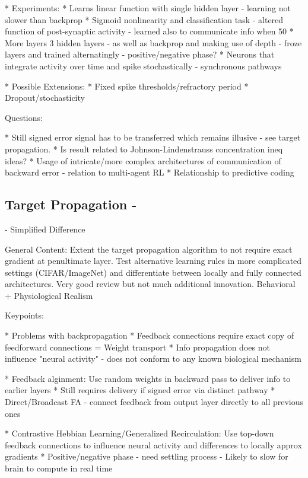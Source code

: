 \documentclass[colorinlistoftodos]{article}
\theoremstyle{definition}
\begin{document}
* Experiments:
    * Learns linear function with single hidden layer - learning not slower than backprop
    * Sigmoid nonlinearity and classification task - altered function of post-synaptic activity - learned also to communicate info when 50%
    * More layers 3 hidden layers - as well as backprop and making use of depth - froze layers and trained alternatingly - positive/negative phase?
    * Neurons that integrate activity over time and spike stochastically - synchronous pathways

* Possible Extensions:
    * Fixed spike thresholds/refractory period
    * Dropout/stochasticity

Questions:

* Still signed error signal has to be transferred which remains illusive - see target propagation.
* Is result related to Johnson-Lindenstrauss concentration ineq ideas?
* Usage of intricate/more complex architectures of communication of backward error - relation to multi-agent RL
* Relationship to predictive coding


\subsection*{Target Propagation - \citet{lee2015, bartunov2018}}


\citet{bartunov2018} - Simplified Difference

General Content: Extent the target propagation algorithm to not require exact gradient at penultimate layer. Test alternative learning rules in more complicated settings (CIFAR/ImageNet) and differentiate between locally and fully connected architectures. Very good review but not much additional innovation. Behavioral + Physiological Realism


Keypoints:

* Problems with backpropagation
    * Feedback connections require exact copy of feedforward connections = Weight transport
    * Info propagation does not influence "neural activity" - does not conform to any known biological mechanism

* Feedback alginment: Use random weights in backward pass to deliver info to earlier layers
    * Still requires delivery if signed error via distinct pathway
    * Direct/Broadcast FA - connect feedback from output layer directly to all previous ones

* Contrastive Hebbian Learning/Generalized Recirculation: Use top-down feedback connections to influence neural activity and differences to locally approx gradients
    * Positive/negative phase - need settling process - Likely to slow for brain to compute in real time
\end{document}
